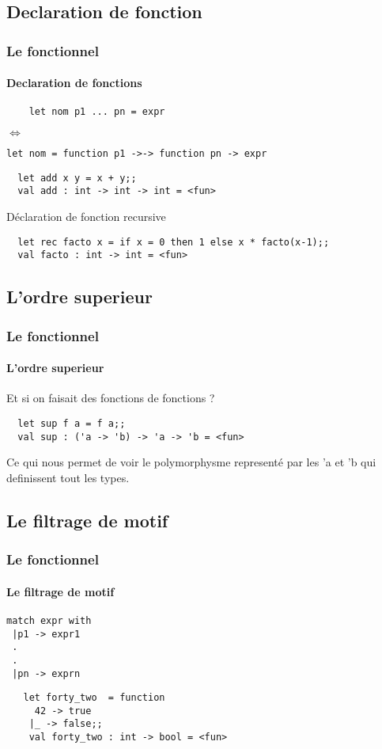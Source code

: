 

\subsection{Declaration de fonction}
\begin{frame}[fragile]
  \frametitle{Le fonctionnel}
  \framesubtitle{Declaration de fonctions}
    \begin{lstlisting}
	let nom p1 ... pn = expr
    \end{lstlisting}
	\begin{center}
	  \begin{rotate}{90}
     $\Leftrightarrow$
   \end{rotate}
\end{center}
\begin{lstlisting}
let nom = function p1 ->-> function pn -> expr
  \end{lstlisting}
  \vspace{1cm}
  \begin{lstlisting}
  let add x y = x + y;;
  val add : int -> int -> int = <fun>
  \end{lstlisting}
  Déclaration de fonction recursive 
  \begin{lstlisting}
  let rec facto x = if x = 0 then 1 else x * facto(x-1);;
  val facto : int -> int = <fun>
  \end{lstlisting}
\end{frame}


\subsection{L'ordre superieur}
\begin{frame}[fragile]
  \frametitle{Le fonctionnel}
  \framesubtitle{L'ordre superieur}
  Et si on faisait des fonctions de fonctions ? 
 \begin{lstlisting}
  let sup f a = f a;;
  val sup : ('a -> 'b) -> 'a -> 'b = <fun>
 \end{lstlisting}
 Ce qui nous permet de voir le polymorphysme representé par les 'a et 'b qui definissent tout les types.
\end{frame}


      \subsection{Le filtrage de motif}
\begin{frame}[fragile]
  \frametitle{Le fonctionnel}
  \framesubtitle{Le filtrage de motif}
  \begin{minipage}[t]{5cm}
    \begin{lstlisting}
match expr with
 |p1 -> expr1
 .
 .
 |pn -> exprn
 \end{lstlisting}
 \end{minipage}
 \begin{minipage}[t]{8cm}
   \begin{lstlisting}
   let forty_two  = function
     42 -> true
    |_ -> false;;
    val forty_two : int -> bool = <fun>
   \end{lstlisting} 
 \end{minipage}
\end{frame}

